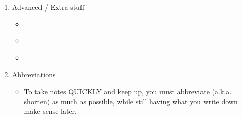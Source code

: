 \documentclass[../../Main/main.tex]{subfiles}
\begin{document}
\begin{enumerate}
	      \begin{boxBluePointy}
		      Blue Pointy Box
	      \end{boxBluePointy}

	      \begin{boxBox}{Title}
		      Centered Title Box
	      \end{boxBox}

	      \begin{boxcompareHSplit}{Step By Step Math}
		      \begin{equation}
			      i = \frac{n(n+1)}{2}.
		      \end{equation}
		      \tcblower
		      \begin{equation}
			      \sum\limits_{i=1}^n i = \frac{n(n+1)}{2}.
		      \end{equation}
	      \end{boxcompareHSplit}

	\item Advanced / Extra stuff
	      \begin{itemize}
		      \item {}
		      \item \colorbox{dracCyan}{}
		      \item {}
	      \end{itemize}

	\item Abbreviations
	      \begin{itemize}
		      \item To take notes QUICKLY and keep up, you must abbreviate (a.k.a. shorten) as much as possible, while still having what you write down make sense later.
	      \end{itemize}
\end{enumerate}
\end{document}
